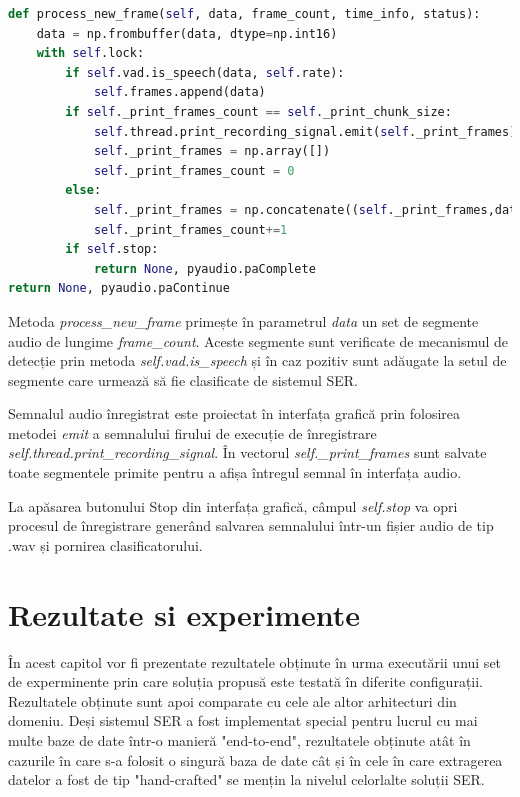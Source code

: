 \documentclass[a4paper,12pt]{book}
\begin{document}
\begin{lstlisting}[language=Python, caption={Procesarea unui nou segmente al semnalului audio inregistrat. Daca segmentul nu contine discurs uman este exclus din inregistrarea finala.}]		
def process_new_frame(self, data, frame_count, time_info, status):
	data = np.frombuffer(data, dtype=np.int16)
	with self.lock:
		if self.vad.is_speech(data, self.rate):
			self.frames.append(data)
		if self._print_frames_count == self._print_chunk_size:
			self.thread.print_recording_signal.emit(self._print_frames)
			self._print_frames = np.array([])
			self._print_frames_count = 0
		else:
			self._print_frames = np.concatenate((self._print_frames,data), axis=0)
			self._print_frames_count+=1
		if self.stop:
			return None, pyaudio.paComplete
return None, pyaudio.paContinue	\end{lstlisting}
		Metoda \textit{process\_new\_frame} primește în parametrul \textit{data} un set de segmente audio de lungime \textit{frame\_count}. Aceste segmente sunt verificate de mecanismul de detecție prin metoda \textit{self.vad.is\_speech} și în caz pozitiv sunt adăugate la setul de segmente care urmează să fie clasificate de sistemul SER. \par
		Semnalul audio înregistrat este proiectat în interfața grafică prin folosirea metodei \textit{emit} a semnalului firului de execuție de înregistrare \textit{self.thread.print\_recording\_signal}. În vectorul \textit{self.\_print\_frames} sunt salvate toate segmentele primite pentru a afișa întregul semnal în interfața audio. \par
		La apăsarea butonului Stop din interfața grafică, câmpul \textit{self.stop} va opri procesul de înregistrare generând salvarea semnalului într-un fișier audio de tip .wav și pornirea clasificatorului.
		
		 
		\chapter{Rezultate si experimente} \label{rezultate}
		 
		 În acest capitol vor fi prezentate rezultatele obținute în urma executării unui set de experminente prin care soluția propusă este testată în diferite configurații. Rezultatele obținute sunt apoi comparate cu cele ale altor arhitecturi din domeniu. Deși sistemul SER a fost implementat special pentru lucrul cu mai multe baze de date într-o manieră "end-to-end", rezultatele obținute atât în cazurile în care s-a folosit o singură baza de date cât și în cele în care extragerea datelor a fost de tip "hand-crafted" se mențin la nivelul celorlalte soluții SER.\par
		 
\end{document}
